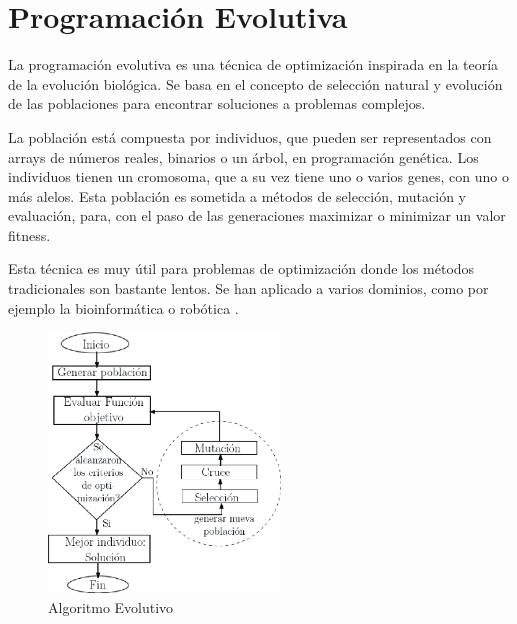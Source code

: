 \section{Programación Evolutiva}


	La programación evolutiva es una técnica de optimización inspirada en la teoría de la evolución biológica. Se basa en el concepto de selección natural y evolución de las poblaciones para encontrar soluciones a problemas complejos. 
	
	La población está compuesta por individuos, que pueden ser representados con arrays de números reales, binarios o un árbol, en programación genética. Los individuos tienen un cromosoma, que a su vez tiene uno o varios genes, con uno o más alelos. Esta población es sometida a métodos de selección, mutación y evaluación, para, con el paso de las generaciones maximizar o minimizar un valor fitness.
	
	Esta técnica es muy útil para problemas de optimización donde los métodos tradicionales son bastante lentos.  Se han aplicado a varios dominios, como por ejemplo la bioinformática o robótica \cite{contreras2015mobile}.


	\begin{figure}[!h]
		\centering
		\includegraphics[width=0.55\textwidth]{images/chapter_2/AG}
		\caption{Algoritmo Evolutivo}
		\label{fig:AG}
	\end{figure}




